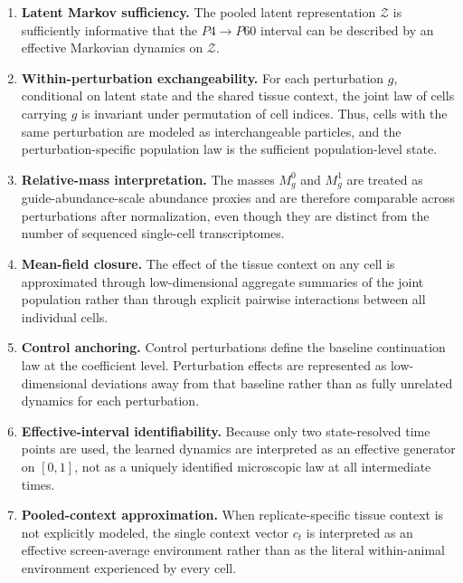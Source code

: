\documentclass[11pt]{article}
\newcommand{\Zcal}{\mathcal{Z}}
\begin{document}
\begin{enumerate}[label=(A\arabic*),leftmargin=2.8em]
    \item \textbf{Latent Markov sufficiency.}
    The pooled latent representation $\Zcal$ is sufficiently informative that the $P4\to P60$ interval can be described by an effective Markovian dynamics on $\Zcal$.

    \item \textbf{Within-perturbation exchangeability.}
    For each perturbation $g$, conditional on latent state and the shared tissue context, the joint law of cells carrying $g$ is invariant under permutation of cell indices. Thus, cells with the same perturbation are modeled as interchangeable particles, and the perturbation-specific population law is the sufficient population-level state.

    \item \textbf{Relative-mass interpretation.}
    The masses $M_g^0$ and $M_g^1$ are treated as guide-abundance-scale abundance proxies and are therefore comparable across perturbations after normalization, even though they are distinct from the number of sequenced single-cell transcriptomes.

    \item \textbf{Mean-field closure.}
    The effect of the tissue context on any cell is approximated through low-dimensional aggregate summaries of the joint population rather than through explicit pairwise interactions between all individual cells.

    \item \textbf{Control anchoring.}
    Control perturbations define the baseline continuation law at the coefficient level. Perturbation effects are represented as low-dimensional deviations away from that baseline rather than as fully unrelated dynamics for each perturbation.

    \item \textbf{Effective-interval identifiability.}
    Because only two state-resolved time points are used, the learned dynamics are interpreted as an effective generator on $[0,1]$, not as a uniquely identified microscopic law at all intermediate times.

    \item \textbf{Pooled-context approximation.}
    When replicate-specific tissue context is not explicitly modeled, the single context vector $c_t$ is interpreted as an effective screen-average environment rather than as the literal within-animal environment experienced by every cell.
\end{enumerate}
\end{document}
